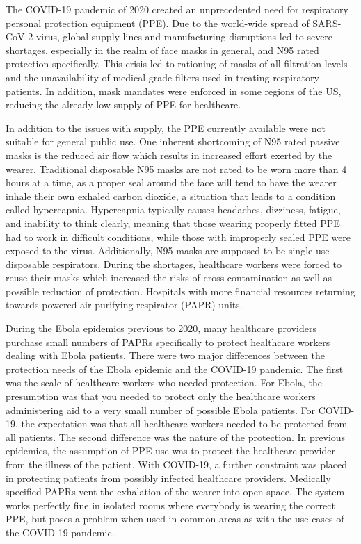 \documentclass[a4paper]{article}
\begin{document}
{The COVID-19 pandemic of 2020 created an unprecedented need for respiratory personal protection equipment (PPE). Due to the world-wide spread of SARS-CoV-2 virus, global supply lines and manufacturing disruptions led to severe shortages, especially in the realm of face masks in general, and N95 rated protection specifically. This crisis led to rationing of masks of all filtration levels and the unavailability of medical grade filters used in treating respiratory patients. In addition, mask mandates were enforced in some regions of the US, reducing the already low supply of PPE for healthcare.

In addition to the issues with supply, the PPE currently available were not suitable for general public use. One inherent shortcoming of N95 rated passive masks is the reduced air flow which results in increased effort exerted by the wearer. Traditional disposable N95 masks are not rated to be worn more than 4 hours at a time, as a proper seal around the face will tend to have the wearer inhale their own exhaled carbon dioxide, a situation that leads to a condition called hypercapnia.  Hypercapnia typically causes headaches, dizziness, fatigue, and inability to think clearly, meaning that those wearing properly fitted PPE had to work in difficult conditions, while those with improperly sealed PPE were exposed to the virus. Additionally, N95 masks are supposed to be single-use disposable respirators. During the shortages, healthcare workers were forced to reuse their masks which increased the risks of cross-contamination as well as possible reduction of protection. Hospitals with more financial resources returning towards powered air purifying respirator (PAPR) units.

During the Ebola epidemics previous to 2020, many healthcare providers purchase small numbers of PAPRs specifically to protect healthcare workers dealing with Ebola patients. There were two major differences between the protection needs of the Ebola epidemic and the COVID-19 pandemic. The first was the scale of healthcare workers who needed protection. For Ebola, the presumption was that you needed to protect only the healthcare workers administering aid to a very small number of possible Ebola patients. For COVID-19, the expectation was that all healthcare workers needed to be protected from all patients. The second difference was the nature of the protection. In previous epidemics, the assumption of PPE use was to protect the healthcare provider from the illness of the patient. With COVID-19, a further constraint was placed in protecting patients from possibly infected healthcare providers. Medically specified PAPRs vent the exhalation of the wearer into open space. The system works perfectly fine in isolated rooms where everybody is wearing the correct PPE, but poses a problem when used in common areas as with the use cases of the COVID-19 pandemic.

}
\end{document}

